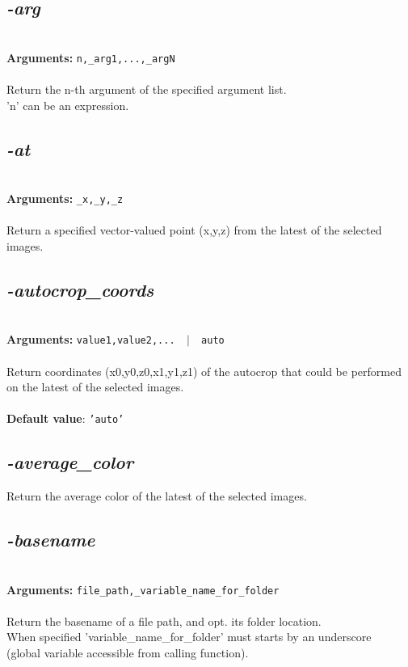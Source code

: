 \documentclass[a4paper,11pt,twoside]{book}
\begin{document}
\subsection{\emph{-arg} }\vspace*{-0.5em}
~\\\textbf{Arguments: } 
{\small \texttt{n,\_arg1,...,\_argN}}\\~\\
Return the n-th argument of the specified argument list.
~\\'n' can be an expression.


\subsection{\emph{-at} }\vspace*{-0.5em}
~\\\textbf{Arguments: } 
{\small \texttt{\_x,\_y,\_z}}\\~\\
Return a specified vector-valued point (x,y,z) from the latest of the selected images.


\subsection{\emph{-autocrop\_coords} }\vspace*{-0.5em}
~\\\textbf{Arguments: } 
{\small \texttt{value1,value2,... ~$|$~ auto}}\\~\\
Return coordinates (x0,y0,z0,x1,y1,z1) of the autocrop that could be performed on the latest of the selected images.
~\\~\\\textbf{Default value}: {\small \texttt{'auto'}}


\subsection{\emph{-average\_color} }\vspace*{-0.5em}
Return the average color of the latest of the selected images.


\subsection{\emph{-basename} }\vspace*{-0.5em}
~\\\textbf{Arguments: } 
{\small \texttt{file\_path,\_variable\_name\_for\_folder}}\\~\\
Return the basename of a file path, and opt. its folder location.
~\\When specified 'variable\_name\_for\_folder' must starts by an underscore
~\\(global variable accessible from calling function).
\end{document}
